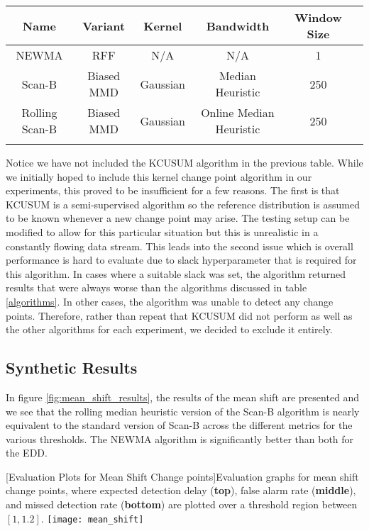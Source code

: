 \begin{center}
\begin{tabular}{SSSSSS} \toprule
    {Name} & {Variant} & {Kernel} & {Bandwidth} & {Window Size}\\ \midrule
    {NEWMA}  & {RFF} & {N/A} & {N/A} & 1  \\
    {Scan-B}  & {Biased MMD}  & {Gaussian} & {Median Heuristic} & 250   \\
    {Rolling Scan-B} & {Biased MMD}   & {Gaussian} & {Online Median Heuristic}  & 250  \\ \bottomrule
\label{algorithms}
\end{tabular}
\end{center}

Notice we have not included the KCUSUM algorithm in the previous table. While we initially hoped to include this kernel change point algorithm in our experiments, this proved to be insufficient for a few reasons. The first is that KCUSUM is a semi-supervised algorithm so the reference distribution is assumed to be known whenever a new change point may arise. The testing setup can be modified to allow for this particular situation but this is unrealistic in a constantly flowing data stream. This leads into the second issue which is overall performance is hard to evaluate due to slack hyperparameter that is required for this algorithm. In cases where a suitable slack was set, the algorithm returned results that were always worse than the algorithms discussed in table \ref{algorithms}. In other cases, the algorithm was unable to detect any change points. Therefore, rather than repeat that KCUSUM did not perform as well as the other algorithms for each experiment, we decided to exclude it entirely. 

\subsection{Synthetic Results}
In figure \ref{fig:mean_shift_results}, the results of the mean shift are presented and we see that the rolling median heuristic version of the Scan-B algorithm is nearly equivalent to the standard version of Scan-B across the different metrics for the various thresholds. The NEWMA algorithm is significantly better than both for the EDD.

\begin{center} 
[Evaluation Plots for Mean Shift Change points]{Evaluation graphs for mean shift change points, where expected detection delay (\textbf{top}), false alarm rate (\textbf{middle}), and missed detection rate (\textbf{bottom}) are plotted over a threshold region between $[1,1.2]$. } 
\texttt{[image: mean\_shift]} 
\label{fig:mean_shift_results} 
\end{center}

